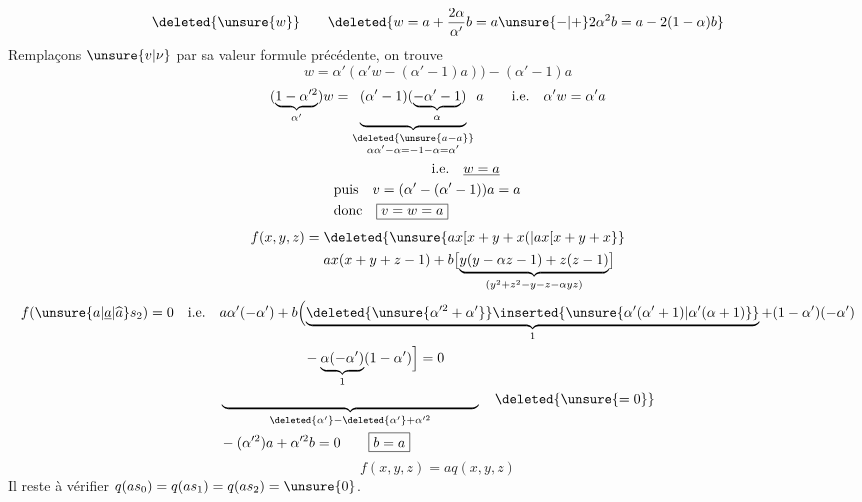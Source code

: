\[
\deleted{\unsure{w}}\qquad\deleted{w=a+\frac{2\alpha}{\alpha'}b=a\unsure{-|+}2\alpha^2b=a-2(1-\alpha)b}
\]
Remplaçons $\unsure{v|\nu}$ par sa valeur  formule précédente, on trouve
\[
w=\alpha'(\alpha'w-(\alpha'-1)a))-(\alpha'-1)a
\]
\[
\begin{aligned}
(\underbrace{1-\alpha^{\prime 2}}_{\alpha'})w
&=\underbrace{(\alpha'-1)(\underbrace{-\alpha'-1}_{\alpha})}_{\substack{\deleted{\unsure{a-a}}\\\alpha\alpha'-\alpha=-1-\alpha=\alpha'}}a
\qquad\text{i.e.}\quad\alpha'w=\alpha'a\\
&\hspace{7em}\text{i.e.}\quad\underline{w=a}\\
&\text{puis}\quad v=(\alpha'-(\alpha'-1))a=a\\
&\text{donc}\quad\boxed{v=w=a}
\end{aligned}
\]
\[
\begin{aligned}
f(x,y,z)={}&\deleted{\unsure{ax[x+y+x(|ax[x+y+x}}\\
&ax(x+y+z-1)+b\bigl[\underbrace{y(y-\alpha z-1)+z(z-1)}_{(y^2+z^2-y-z-\alpha yz)}\bigr]
\end{aligned}
\]
\[
\begin{aligned}
f(\unsure{a|\underline a|\widehat a}s_2)=0\quad\text{i.e.}\quad
&a\alpha'(-\alpha')+b\Bigl(\underbrace{\deleted{\unsure{\alpha^{\prime 2}+\alpha'}}\inserted{\unsure{\alpha'(\alpha'+1)|\alpha'(\alpha+1)}}}_{1}+(1-\alpha')(-\alpha')\\
&\hspace{6em}-\underbrace{\alpha(-\alpha')}_{1}(1-\alpha')\Bigr]=0\\
&\underbrace{\hphantom{\alpha^{\prime 2}+\alpha'+(1-\alpha')(-\alpha')-\alpha(-\alpha')(1-\alpha')}}_{\deleted{\alpha'}-\deleted{\alpha'}+\alpha^{\prime 2}}\quad\deleted{\unsure{=0}}\\
&-(\alpha^{\prime 2})a+\alpha^{\prime 2}b=0\qquad\boxed{b=a}
\end{aligned}
\]
\[
f(x,y,z)=aq(x,y,z)
\]
Il reste à vérifier $q(as_0)=q(as_1)=q(as_2)=\unsure{0}$.

